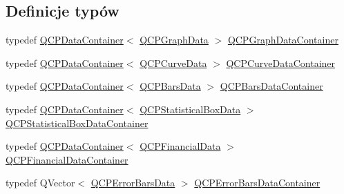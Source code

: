 \subsection*{Definicje typów}
\begin{DoxyCompactItemize}
\item 
typedef \hyperlink{class_q_c_p_data_container}{Q\+C\+P\+Data\+Container}$<$ \hyperlink{class_q_c_p_graph_data}{Q\+C\+P\+Graph\+Data} $>$ \hyperlink{qcustomplot_8hh_a2e5583d1ae212f0deb10537cf975a15a}{Q\+C\+P\+Graph\+Data\+Container}
\item 
typedef \hyperlink{class_q_c_p_data_container}{Q\+C\+P\+Data\+Container}$<$ \hyperlink{class_q_c_p_curve_data}{Q\+C\+P\+Curve\+Data} $>$ \hyperlink{qcustomplot_8hh_aaeee80d5664ea91beb9d7968790d0e65}{Q\+C\+P\+Curve\+Data\+Container}
\item 
typedef \hyperlink{class_q_c_p_data_container}{Q\+C\+P\+Data\+Container}$<$ \hyperlink{class_q_c_p_bars_data}{Q\+C\+P\+Bars\+Data} $>$ \hyperlink{qcustomplot_8hh_a52bf589c9fce1baa36c1d40d69785d46}{Q\+C\+P\+Bars\+Data\+Container}
\item 
typedef \hyperlink{class_q_c_p_data_container}{Q\+C\+P\+Data\+Container}$<$ \hyperlink{class_q_c_p_statistical_box_data}{Q\+C\+P\+Statistical\+Box\+Data} $>$ \hyperlink{qcustomplot_8hh_a8b773c0c35f8f924701ced6e9915e4c7}{Q\+C\+P\+Statistical\+Box\+Data\+Container}
\item 
typedef \hyperlink{class_q_c_p_data_container}{Q\+C\+P\+Data\+Container}$<$ \hyperlink{class_q_c_p_financial_data}{Q\+C\+P\+Financial\+Data} $>$ \hyperlink{qcustomplot_8hh_ae36e482e04f19a54782f01ab38c354a6}{Q\+C\+P\+Financial\+Data\+Container}
\item 
typedef Q\+Vector$<$ \hyperlink{class_q_c_p_error_bars_data}{Q\+C\+P\+Error\+Bars\+Data} $>$ \hyperlink{qcustomplot_8hh_a8c4472a4da738e0ddbf6b03222c39906}{Q\+C\+P\+Error\+Bars\+Data\+Container}
\end{DoxyCompactItemize}
